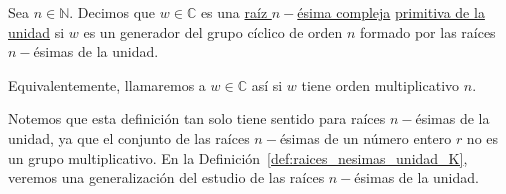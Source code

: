 \begin{definicion}\label{def:raices_nesimas_unidad}
    Sea $n\in \mathbb{N}$. Decimos que $w\in \mathbb{C}$ es una \underline{raíz $n-$ésima compleja} \ul{primitiva de la unidad} si $w$ es un generador del grupo cíclico de orden $n$ formado por las raíces $n-$ésimas de la unidad.

    \noindent
    Equivalentemente, llamaremos a $w\in \mathbb{C}$ así si $w$ tiene orden multiplicativo $n$.
\end{definicion}

Notemos que esta definición tan solo tiene sentido para raíces $n-$ésimas de la unidad, ya que el conjunto de las raíces $n-$ésimas de un número entero $r$ no es un grupo multiplicativo. En la Definición~\ref{def:raices_nesimas_unidad_K}, veremos una generalización del estudio de las raíces $n-$ésimas de la unidad.

